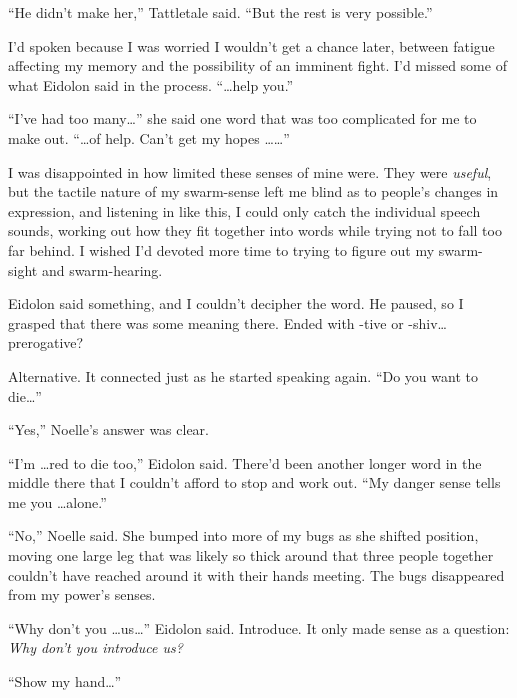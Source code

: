 ``He didn't make her,'' Tattletale said.  ``But the rest is very possible.''



I'd spoken because I was worried I wouldn't get a chance later, between fatigue affecting my memory and the possibility of an imminent fight.  I'd missed some of what Eidolon said in the process.  ``\ldots{}help you.''



``I've had too many\ldots'' she said one word that was too complicated for me to make out.  ``\ldots{}of help.  Can't get my hopes \ldots \ldots''



I was disappointed in how limited these senses of mine were.  They were \emph{useful}, but the tactile nature of my swarm-sense left me blind as to people's changes in expression, and listening in like this, I could only catch the individual speech sounds, working out how they fit together into words while trying not to fall too far behind.  I wished I'd devoted more time to trying to figure out my swarm-sight and swarm-hearing.



Eidolon said something, and I couldn't decipher the word.  He paused, so I grasped that there was some meaning there.  Ended with -tive or -shiv\ldots prerogative?



Alternative.  It connected just as he started speaking again.  ``Do you want to die\ldots''



``Yes,'' Noelle's answer was clear.



``I'm \ldots{}red to die too,'' Eidolon said.  There'd been another longer word in the middle there that I couldn't afford to stop and work out.  ``My danger sense tells me you \ldots alone.''



``No,'' Noelle said.  She bumped into more of my bugs as she shifted position, moving one large leg that was likely so thick around that three people together couldn't have reached around it with their hands meeting.  The bugs disappeared from my power's senses.



``Why don't you \ldots us\ldots'' Eidolon said.  Introduce.  It only made sense as a question:  \emph{Why don't you introduce us?}



``Show my hand\ldots''



